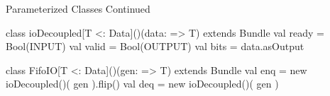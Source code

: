 \documentclass[xcolor=pdflatex,dvipsnames,table]{beamer}
\begin{document}
\begin{frame}[fragile]{Parameterized Classes Continued}
\begin{scala}
class ioDecoupled[T <: Data]()(data: => T) extends Bundle {
  val ready = Bool(INPUT)
  val valid = Bool(OUTPUT)
  val bits  = data.asOutput
}

class FifoIO[T <: Data]()(gen: => T) extends Bundle  {
  val enq = new ioDecoupled()( gen ).flip()
  val deq = new ioDecoupled()( gen )
}
\end{scala}
\end{frame}
\end{document}

